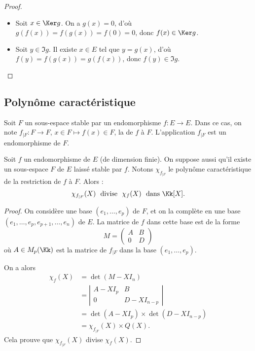 \documentclass[12pt, class=report,crop=false]{standalone}
\begin{document}
\begin{proof}~
\begin{itemize}
  \item Soit $x\in\Ker g$. On  a $g(x)=0$, d'où $g(f(x))=f(g(x))=f(0)=0$, donc $f(x)\in\Ker g$.

  \item Soit $y\in\Im g$. Il existe $x\in E$ tel que $y=g(x)$, d'où $f(y)=f(g(x))=g(f(x))$, donc $f(y)\in \Im g$.
\end{itemize}
\end{proof} 



\subsection{Polynôme caractéristique}

Soit $F$ un sous-espace stable par un endomorphisme $f : E \to E$.
Dans ce cas, on note $f_{|F} : F \to F$, $x \in F \mapsto f(x) \in F$, la  de $f$ à $F$. L'application $f_{|F}$ est un endomorphisme de $F$.

\begin{lemme}
\label{lem:restr}
Soit $f$ un endomorphisme de $E$ (de dimension finie).
On suppose aussi qu'il existe un sous-espace $F$ de $E$ laissé stable par $f$. 
Notons $\chi_{f_{|F}}$ le polynôme caractéristique de la restriction de $f$ à $F$. 
Alors :
\[\chi_{f_{|F}}(X) \ \text{ divise } \  \chi_f(X) \ \text{ dans } \Kk[X].\]

\end{lemme}




\begin{proof}
On considère une base $(e_1,\dots,e_p)$ de $F$, 
et on la complète en une base $(e_1,\dots,e_p,e_{p+1},\dots,e_n)$ de $E$. 
La matrice de $f$ dans cette base est de la forme
$$M = \left(\begin{array}{c|c}
A & B \\ \hline 
0 & D \end{array}\right)$$
où $A \in M_p(\Kk)$ est la matrice de $f_{|F}$ dans la base $(e_1,\dots,e_p)$. 

On a alors
\begin{align*}
\chi_f(X) 
 &= \det(M-XI_n) \\
 &= \left|\begin{array}{c|c}
 A-XI_p & B \\ \hline 
 0 & D-XI_{n-p}\end{array}\right| \\
 &= \det(A-XI_p) \times \det(D-XI_{n-p}) \\
 &= \chi_{f_{|F}}(X) \times Q(X).
\end{align*}
Cela prouve que $\chi_{f_{|F}}(X)$ divise $\chi_f(X)$.
\end{proof}
\end{document}
